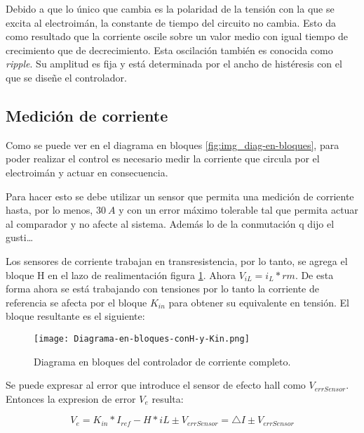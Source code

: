 
Debido a que lo único que cambia es la polaridad de la tensión con la que se excita al electroimán, la constante de tiempo del circuito no cambia. Esto da como resultado  que la corriente oscile sobre un valor medio con igual tiempo de crecimiento que de decrecimiento. Esta oscilación también es conocida como \textsl{ripple}. Su amplitud es fija y está determinada por el ancho de histéresis con el que se diseñe el controlador. 

\subsection{Medición de corriente}


Como se puede ver en el diagrama en bloques \ref{fig:img_diag-en-bloques}, para poder realizar el control es necesario medir la corriente que circula por el electroimán y actuar en consecuencia.


Para hacer esto se debe utilizar un sensor que permita una medición de corriente hasta, por lo menos, $30\:A$  y con un error máximo tolerable tal que permita actuar al comparador y no afecte al sistema. Además lo de la conmutación q dijo el gusti…

Los sensores de corriente trabajan en transresistencia, por lo tanto, se agrega el bloque H en el lazo de realimentación figura \ref{fig:img_diag-en-bloques-conH-y-Kin}. Ahora $V_{iL}=i_{L}*rm$. De esta forma ahora se está trabajando con tensiones por lo tanto la corriente de referencia se afecta por el bloque $K_{in}$ para obtener su equivalente en tensión. El bloque resultante es el siguiente:

\begin{figure}[H]
	\centering
	\texttt{[image: Diagrama-en-bloques-conH-y-Kin.png]}
	\caption{Diagrama en bloques del controlador de corriente completo.}
	\label{fig:img_diag-en-bloques-conH-y-Kin}
\end{figure}

Se puede expresar al error que introduce el sensor de efecto hall como $V_{errSensor}$. Entonces la expresion de error $V_{e}$ resulta: 

\begin{equation}\label{eq_error_ve}
	V_{e}= K_{in}*I_{ref}-H*iL\pm V_{errSensor}=\triangle I \pm V_{errSensor}
\end{equation}


